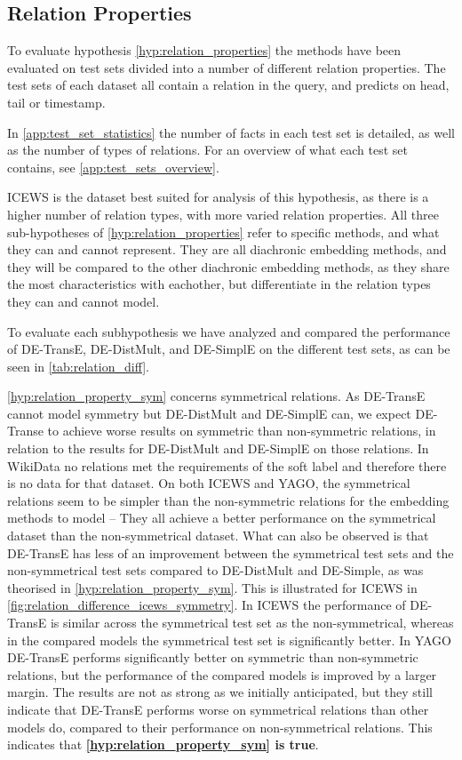 \subsection{Relation Properties}
\label{sec:relation_properties_experiment}
%


To evaluate hypothesis \autoref{hyp:relation_properties} the methods have been evaluated on test sets divided into a number of different relation properties. The test sets of each dataset all contain a relation in the query, and predicts on head, tail or timestamp.

In \autoref{app:test_set_statistics} the number of facts in each test set is detailed, as well as the number of types of relations.
For an overview of what each test set contains, see \autoref{app:test_sets_overview}.

ICEWS is the dataset best suited for analysis of this hypothesis, as there is a higher number of relation types, with more varied relation properties.
All three sub-hypotheses of \autoref{hyp:relation_properties} refer to specific methods, and what they can and cannot represent. They are all diachronic embedding methods, and they will be compared to the other diachronic embedding methods, as they share the most characteristics with eachother, but differentiate in the relation types they can and cannot model.

To evaluate each subhypothesis we have analyzed and compared the performance of DE-TransE, DE-DistMult, and DE-SimplE on the different test sets, as can be seen in \autoref{tab:relation_diff}.

\autoref{hyp:relation_property_sym} concerns symmetrical relations. As DE-TransE cannot model symmetry but DE-DistMult and DE-SimplE can, we expect DE-Transe to achieve worse results on symmetric than non-symmetric relations, in relation to the results for DE-DistMult and DE-SimplE on those relations.
In WikiData no relations met the requirements of the soft label and therefore there is no data for that dataset.
On both ICEWS and YAGO, the symmetrical relations seem to be simpler than the non-symmetric relations for the embedding methods to model -- They all achieve a better performance on the symmetrical dataset than the non-symmetrical dataset. What can also be observed is that DE-TransE has less of an improvement between the symmetrical test sets and the non-symmetrical test sets compared to DE-DistMult and DE-Simple, as was theorised in \autoref{hyp:relation_property_sym}. This is illustrated for ICEWS in \autoref{fig:relation_difference_icews_symmetry}.
In ICEWS the performance of DE-TransE is similar across the symmetrical test set as the non-symmetrical, whereas in the compared models the symmetrical test set is significantly better. In YAGO DE-TransE performs significantly better on symmetric than non-symmetric relations, but the performance of the compared models is improved by a larger margin.
The results are not as strong as we initially anticipated, but they still indicate that DE-TransE performs worse on symmetrical relations than other models do, compared to their performance on non-symmetrical relations. This indicates that \textbf{\autoref{hyp:relation_property_sym} is true}.

